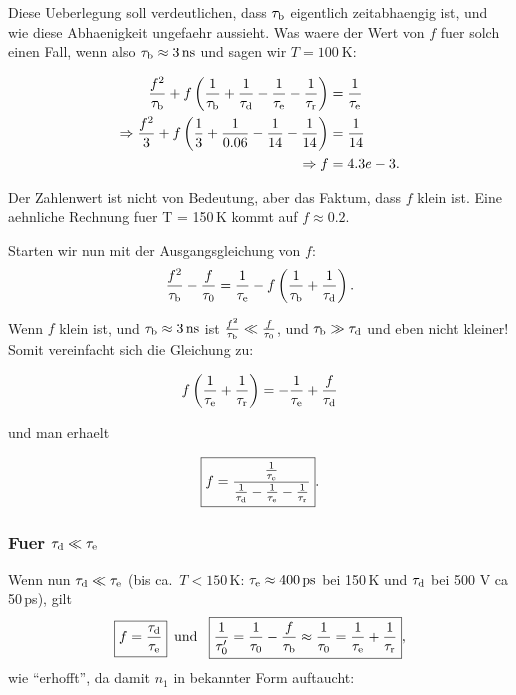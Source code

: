 Diese Ueberlegung soll verdeutlichen, dass $\tau_{\textrm{b}}$ eigentlich zeitabhaengig ist, und wie diese Abhaenigkeit ungefaehr aussieht. 
Was waere der Wert von $f$ fuer solch einen Fall, wenn also $\tau_{\textrm{b}} \approx \SI{3}{\nano\second}$ und sagen wir $T = \SI{100}{\kelvin}$:

\begin{align}
  \frac{f^2}{\tau_{\textrm{b}}} + f \left( \frac{1}{\tau_{\textrm{b}}} + \frac{1}{\tau_{\textrm{d}}} - \frac{1}{\tau_\textrm{e}} -\frac{1}{\tau_\textrm{r}} \right) &= \frac{1}{\tau_\textrm{e}}\\
  \Rightarrow
  \frac{f^2}{3} + f \left( \frac{1}{3} + \frac{1}{0.06} - \frac{1}{14} -\frac{1}{14} \right) &= \frac{1}{14}\\
  \Rightarrow 
  f &= 4.3e-3.
\end{align}

\noindent
Der Zahlenwert ist nicht von Bedeutung, aber das Faktum, dass $f$ klein ist. 
Eine aehnliche Rechnung fuer T = 150\,K kommt auf $f \approx 0.2$.

Starten wir nun mit der Ausgangsgleichung von $f$:
\begin{equation*}
 \frac{f^2}{\tau_{\textrm{b}}} - \frac{f}{\tau_{0}} = \frac{1}{\tau_\textrm{e}} - f \left( \frac{1}{\tau_{\textrm{b}}} + \frac{1}{\tau_{\textrm{d}}} \right).
\end{equation*}

\noindent
Wenn $f$ klein ist, und $\taub \approx \SI{3}{\ns}$ ist $\frac{f^2}{\tau_{\textrm{b}}} \ll \frac{f}{\tau_{0}}$, und $\tau_{\textrm{b}} \gg \tau_{\textrm{d}}$ und eben nicht kleiner! %
Somit vereinfacht sich die Gleichung zu:

\begin{equation}
  f \left( \frac{1}{\tau_\textrm{e}} + \frac{1}{\tau_\textrm{r}} \right)= -\frac{1}{\tau_\textrm{e}} + \frac{f}{\tau_{\textrm{d}}}
\end{equation}

\noindent
und man erhaelt

\begin{equation}
 \boxed{ f = \frac{\frac{1}{\tau_\textrm{e}}}{\frac{1}{\tau_{\textrm{d}}} - \frac{1}{\tau_\textrm{e}} - \frac{1}{\tau_\textrm{r}}} }. 
\end{equation}

\subsubsection{Fuer $\tau_{\textrm{d}} \ll \tau_\textrm{e}$}
Wenn nun $\tau_{\textrm{d}} \ll \tau_\textrm{e}$ (bis ca.\ $T < 150$\,K: $\tauevap \approx \SI{400}{\ps}$ bei 150\,K und $\tau_{\textrm{d}}$ bei 500 V ca 50\,ps), gilt 
\begin{equation}
 \boxed{f = \frac{\tau_{\textrm{d}}}{\tau_\textrm{e}}}\,\,\, \textrm{und } \,\,\, \boxed{\frac{1}{\tau_{0}^{\prime}} = \frac{1}{\tau_{0}} - \frac{f}{\tau_{\textrm{b}}} \approx \frac{1}{\tau_{0}} = \frac{1}{\tau_\textrm{e}} + \frac{1}{\tau_\textrm{r}}}, 
\end{equation}
wie ``erhofft'', da damit $n_1$ in bekannter Form auftaucht:


